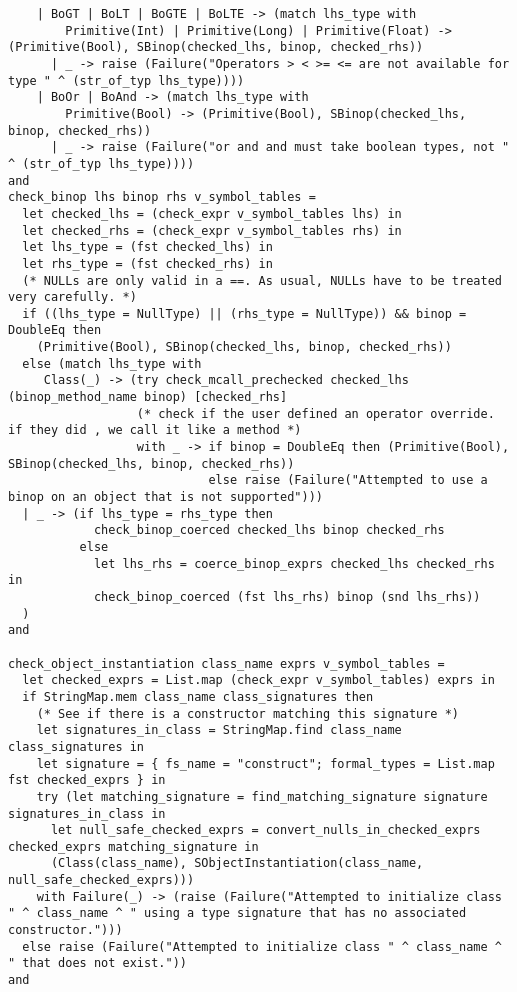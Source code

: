 \documentclass{article}
\begin{document}
\begin{verbatim}
    | BoGT | BoLT | BoGTE | BoLTE -> (match lhs_type with
        Primitive(Int) | Primitive(Long) | Primitive(Float) -> (Primitive(Bool), SBinop(checked_lhs, binop, checked_rhs))
      | _ -> raise (Failure("Operators > < >= <= are not available for type " ^ (str_of_typ lhs_type))))
    | BoOr | BoAnd -> (match lhs_type with
        Primitive(Bool) -> (Primitive(Bool), SBinop(checked_lhs, binop, checked_rhs))
      | _ -> raise (Failure("or and and must take boolean types, not " ^ (str_of_typ lhs_type))))
and
check_binop lhs binop rhs v_symbol_tables =
  let checked_lhs = (check_expr v_symbol_tables lhs) in
  let checked_rhs = (check_expr v_symbol_tables rhs) in
  let lhs_type = (fst checked_lhs) in
  let rhs_type = (fst checked_rhs) in
  (* NULLs are only valid in a ==. As usual, NULLs have to be treated very carefully. *)
  if ((lhs_type = NullType) || (rhs_type = NullType)) && binop = DoubleEq then
    (Primitive(Bool), SBinop(checked_lhs, binop, checked_rhs))
  else (match lhs_type with
     Class(_) -> (try check_mcall_prechecked checked_lhs (binop_method_name binop) [checked_rhs]
                  (* check if the user defined an operator override. if they did , we call it like a method *)
                  with _ -> if binop = DoubleEq then (Primitive(Bool), SBinop(checked_lhs, binop, checked_rhs))
                            else raise (Failure("Attempted to use a binop on an object that is not supported")))
  | _ -> (if lhs_type = rhs_type then
            check_binop_coerced checked_lhs binop checked_rhs
          else
            let lhs_rhs = coerce_binop_exprs checked_lhs checked_rhs in
            check_binop_coerced (fst lhs_rhs) binop (snd lhs_rhs))
  )
and

check_object_instantiation class_name exprs v_symbol_tables =
  let checked_exprs = List.map (check_expr v_symbol_tables) exprs in
  if StringMap.mem class_name class_signatures then
    (* See if there is a constructor matching this signature *)
    let signatures_in_class = StringMap.find class_name class_signatures in
    let signature = { fs_name = "construct"; formal_types = List.map fst checked_exprs } in
    try (let matching_signature = find_matching_signature signature signatures_in_class in
      let null_safe_checked_exprs = convert_nulls_in_checked_exprs checked_exprs matching_signature in
      (Class(class_name), SObjectInstantiation(class_name, null_safe_checked_exprs)))
    with Failure(_) -> (raise (Failure("Attempted to initialize class " ^ class_name ^ " using a type signature that has no associated constructor.")))
  else raise (Failure("Attempted to initialize class " ^ class_name ^ " that does not exist."))
and


\end{verbatim}
\end{document}
